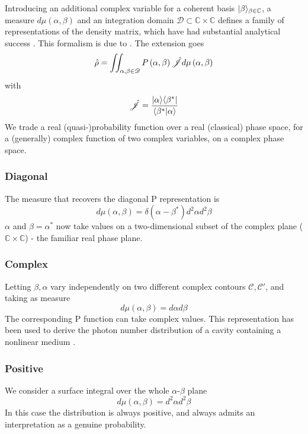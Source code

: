 Introducing an additional complex variable for a coherent basis {$| \beta \rangle_{\beta\in\mathbb{C}}$}, a measure $d\mu(\alpha, \beta)$ and an integration domain $\mathscr{D}\subset\mathbb{C}\times\mathbb{C}$ defines a family of representations of the density matrix, which have had substantial analytical success
\cite{Drummond1979}.
This formalism is due to \cite{Drummond1980}.
The extension goes 
\begin{equation}
  \hat{\rho} = \iint_{\alpha, \beta \in \mathscr{D}}P \left( \alpha, \beta \right) \hat{\mathscr{J}} 
          d \mu \left( \alpha, \beta \right)
\end{equation}
with
\begin{equation}
  \hat{\mathscr{J}} = \frac{| \alpha \rangle\langle\beta^* |}{\langle \beta^* | \alpha \rangle} 
\end{equation}
We trade a real (quasi-)probability function over a real (classical) phase space, for a (generally) complex function of two complex variables, on a complex phase space.
\subsubsection{Diagonal} 
The measure that recovers the diagonal P representation is
\begin{equation}
  d\mu(\alpha, \beta) = \delta(\alpha-\beta^*)d^2 \alpha d^2 \beta
\end{equation}
$\alpha$ and $\beta = \alpha^*$ now take values on a two-dimensional subset of the complex plane ($\mathbb{C}\times\mathbb{C}$) - the familiar real phase plane.
\subsubsection{Complex}
Letting $\beta, \alpha$ vary independently on two different complex contours $\mathscr{C}, \mathscr{C}'$, and taking as measure
\begin{equation}
  d\mu\left(\alpha, \beta\right) = d\alpha d\beta
\end{equation}
The corresponding P function can take complex values.
This representation has been used to derive the photon number distribution of a cavity containing a nonlinear medium \cite{Drummond1979}.
\subsubsection{Positive}
We consider a surface integral over the whole $\alpha$-$\beta$ plane
\begin{equation}
  d \mu(\alpha, \beta) = d^2 \alpha d^2 \beta
\end{equation}
In this case the distribution is always positive, and always admits an interpretation as a genuine probability. 
